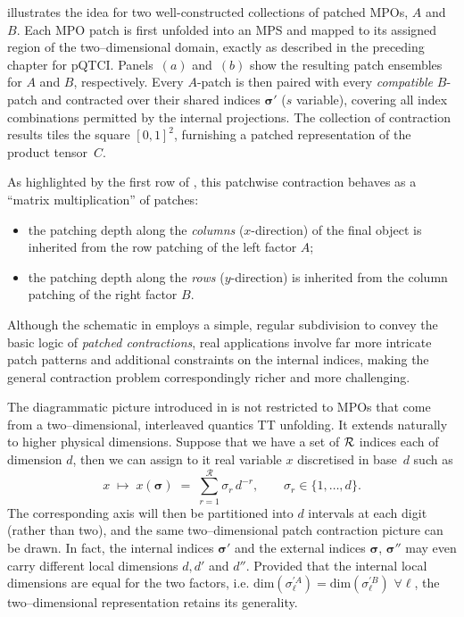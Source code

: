  illustrates the idea for two well-constructed collections of patched MPOs, \(A\) and \(B\).  
Each MPO patch is first unfolded into an MPS and mapped to its assigned region of the two–dimensional domain, exactly as described in the preceding chapter for pQTCI.  
Panels~$(a)$ and~$(b)$ show the resulting patch ensembles for \(A\) and \(B\), respectively.  
Every \(A\)-patch is then paired with every \emph{compatible} \(B\)-patch and contracted over their shared indices \(\boldsymbol{\sigma}'\) ($s$ variable), covering all index combinations permitted by the internal projections\footnotemark.
The collection of contraction results tiles the square
\([0,1]^{2}\), furnishing a patched representation of the product tensor~\(C\).

As highlighted by the first row of , this patchwise contraction behaves as a ``matrix multiplication'' of patches:  
\begin{itemize}
    \item the patching depth along the \emph{columns} (\(x\)-direction) of the final
  object is inherited from the row patching of the left factor \(A\);  
  \item the patching depth along the \emph{rows} (\(y\)-direction) is inherited
  from the column patching of the right factor \(B\).
\end{itemize}
Although the schematic in  employs a simple, regular subdivision to convey the basic logic of \emph{patched contractions}, real applications involve far more intricate patch patterns and additional constraints on the internal indices, making the general contraction problem correspondingly richer and more challenging.

The diagrammatic picture introduced in  is not restricted to MPOs that come
from a two–dimensional, interleaved quantics TT unfolding.  
It extends naturally to higher physical dimensions.  
Suppose that we have a set of $\mathcal{R}$ indices each of dimension $d$, then we can assign to it real variable $x$ discretised in base~\(d\) such as
\begin{equation}
  x \;\mapsto\; x(\boldsymbol{\sigma})
  \;=\;
  \sum_{r=1}^{\mathcal R}\sigma_{r}\,d^{-r},
  \qquad
  \sigma_{r}\in\{1,\dots,d\}.
\end{equation}
The corresponding axis will then be partitioned into \(d\) intervals at each digit (rather than two), and the same two–dimensional patch contraction picture can be drawn.  
In fact, the internal indices \(\boldsymbol{\sigma}'\) and the external indices \(\boldsymbol{\sigma}\), \(\boldsymbol{\sigma}''\) may even carry different local dimensions $d, d'$ and $d''$. Provided that the internal local dimensions are equal for the two factors, i.e. $\text{dim}(\sigma_\ell^{\prime A}) =
\text{dim}(\sigma_\ell^{\prime B})$ $\forall \ell$, the two–dimensional representation retains its generality.

